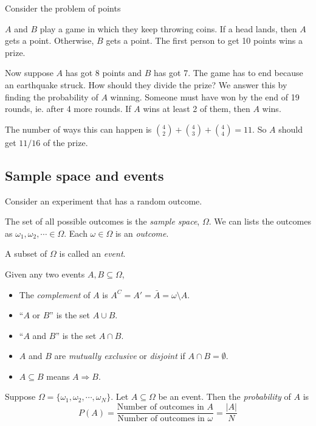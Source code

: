 \documentclass[a4paper]{article}
\begin{document}
Consider the problem of points

$A$ and $B$ play a game in which they keep throwing coins. If a head lands, then $A$ gets a point. Otherwise, $B$ gets a point. The first person to get 10 points wins a prize.

Now suppose $A$ has got 8 points and $B$ has got 7. The game has to end because an earthquake struck. How should they divide the prize? We answer this by finding the probability of $A$ winning. Someone must have won by the end of 19 rounds, ie. after 4 more rounds. If $A$ wins at least 2 of them, then $A$ wins.

The number of ways this can happen is $\binom{4}{2} + \binom{4}{3} + \binom{4}{4} = 11$. So $A$ should get $11/16$ of the prize.

\subsection{Sample space and events}
Consider an experiment that has a random outcome.

\begin{defi}
  The set of all possible outcomes is the \emph{sample space}, $\Omega$. We can lists the outcomes as $\omega_1, \omega_2, \cdots \in \Omega$. Each $\omega \in \Omega$ is an \emph{outcome}.
\end{defi}

\begin{defi}[Event]
  A subset of $\Omega$ is called an \emph{event}.
\end{defi}

\begin{defi}
  Given any two events $A, B\subseteq \Omega$,
  \begin{itemize}
    \item The \emph{complement} of $A$ is $A^C = A' = \bar A = \omega\setminus A$.
    \item ``$A$ or $B$'' is the set $A\cup B$.
    \item ``$A$ and $B$''  is the set $A\cap B$.
    \item $A$ and $B$ are \emph{mutually exclusive} or \emph{disjoint} if $A\cap B = \emptyset$.
    \item $A\subseteq B$ means $A\Rightarrow B$.
  \end{itemize}
\end{defi}

\begin{defi}[Probability]
  Suppose $\Omega = \{\omega_1,\omega_2, \cdots, \omega_N\}$. Let $A\subseteq \Omega$ be an event. Then the \emph{probability} of $A$ is
  \[
    P(A) = \frac{\text{Number of outcomes in } A}{\text{Number of outcomes in }\omega} = \frac{|A|}{N}
  \]
\end{defi}
\end{document}
